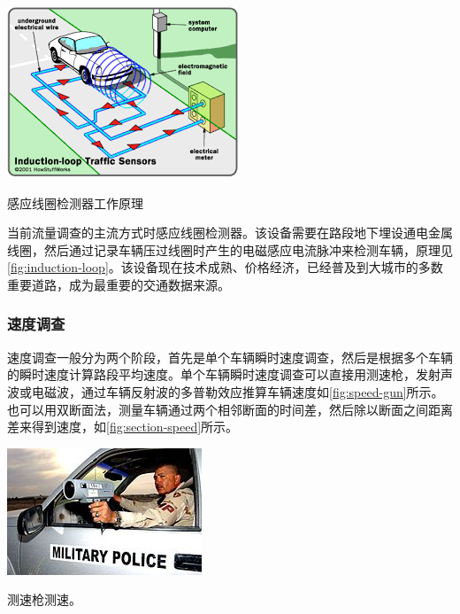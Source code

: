 \begin{marginfigure}
    \includegraphics[width=\linewidth]{images/induction-loop-sensor.png}
    \caption{感应线圈检测器工作原理}
    \label{fig:induction-loop}
\end{marginfigure}

当前流量调查的主流方式时感应线圈检测器。该设备需要在路段地下埋设通电金属线圈，然后通过记录车辆压过线圈时产生的电磁感应电流脉冲来检测车辆，原理见\cref{fig:induction-loop}。该设备现在技术成熟、价格经济，已经普及到大城市的多数重要道路，成为最重要的交通数据来源。

\subsubsection{速度调查}

速度调查一般分为两个阶段，首先是单个车辆瞬时速度调查，然后是根据多个车辆的瞬时速度计算路段平均速度。单个车辆瞬时速度调查可以直接用测速枪，发射声波或电磁波，通过车辆反射波的多普勒效应推算车辆速度如\cref{fig:speed-gun}所示。
也可以用双断面法，测量车辆通过两个相邻断面的时间差，然后除以断面之间距离差来得到速度，如\cref{fig:section-speed}所示。

\begin{marginfigure}
    \includegraphics[width=\linewidth]{images/speed-gun.jpg}
    \caption{测速枪测速。}
    \label{fig:speed-gun}
\end{marginfigure}

